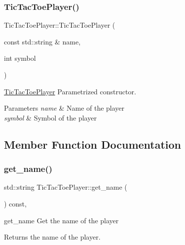 \subsubsection{\texorpdfstring{Tic\+Tac\+Toe\+Player()}{TicTacToePlayer()}}
{\footnotesize\ttfamily Tic\+Tac\+Toe\+Player\+::\+Tic\+Tac\+Toe\+Player (\begin{DoxyParamCaption}\item[{const std\+::string \&}]{name,  }\item[{int}]{symbol }\end{DoxyParamCaption})\hspace{0.3cm}{\ttfamily [inline]}}



\hyperlink{class_tic_tac_toe_player}{Tic\+Tac\+Toe\+Player} Parametrized constructor. 


\begin{DoxyParams}{Parameters}
{\em name} & Name of the player \\
\hline
{\em symbol} & Symbol of the player \\
\hline
\end{DoxyParams}


\subsection{Member Function Documentation}
\mbox{\label{class_tic_tac_toe_player_ace0eccd41811e4345ed6bccdb623e6e7}} 
\subsubsection{\texorpdfstring{get\+\_\+name()}{get\_name()}}
{\footnotesize\ttfamily std\+::string Tic\+Tac\+Toe\+Player\+::get\+\_\+name (\begin{DoxyParamCaption}{ }\end{DoxyParamCaption}) const\hspace{0.3cm}{\ttfamily [inline]}, {\ttfamily [virtual]}}



get\+\_\+name Get the name of the player 

\begin{DoxyReturn}{Returns}
the name of the player. 
\end{DoxyReturn}


